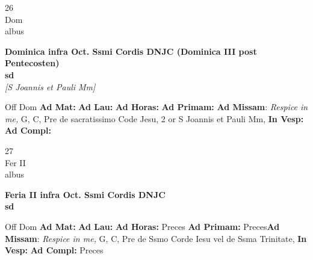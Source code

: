 \documentclass[10pt, openany]{book}
\begin{document}
    \begin{center}
        \begin{minipage}{3.5in}
            \vspace{2em}
            \begin{minipage}{0.5in}
                {\Huge 26} \\
                {\normalsize Dom} \\
                {\normalsize albus}
            \end{minipage}
            \begin{minipage}{3.0in}
                \textbf{ \large Dominica infra Oct. Ssmi Cordis DNJC (Dominica III post Pentecosten) \\
                \textnormal{\normalsize sd}} \\ \textit{[S Joannis et Pauli Mm]} \\ 
            \end{minipage}
            \begin{justify}Off Dom
                \textbf{Ad Mat: }
                \textbf{Ad Lau: }
                \textbf{Ad Horas: }
                \textbf{Ad Primam: }\textbf{Ad Missam}: \textit{Respice in me,} G, C, Pre de sacratissimo Code Jesu, 2 or S Joannis et Pauli Mm,  
                \textbf{In Vesp: }
                \textbf{Ad Compl: }
            \end{justify}
        \end{minipage}
    \end{center}

    \begin{center}
        \begin{minipage}{3.5in}
            \vspace{2em}
            \begin{minipage}{0.5in}
                {\Huge 27} \\
                {\normalsize Fer II} \\
                {\normalsize albus}
            \end{minipage}
            \begin{minipage}{3.0in}
                \textbf{ \large Feria II infra Oct. Ssmi Cordis DNJC \\
                \textnormal{\normalsize sd}} \\ 
            \end{minipage}
            \begin{justify}Off Dom
                \textbf{Ad Mat: }
                \textbf{Ad Lau: }
                \textbf{Ad Horas: }Preces
                \textbf{Ad Primam: }Preces\textbf{Ad Missam}: \textit{Respice in me,} G, C, Pre de Ssmo Corde Iesu vel de Ssma Trinitate,  
                \textbf{In Vesp: }
                \textbf{Ad Compl: }Preces
            \end{justify}
        \end{minipage}
    \end{center}
\end{document}

